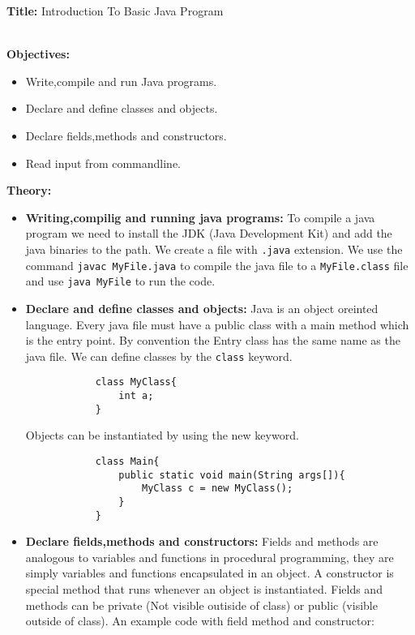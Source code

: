 \documentclass{book}
\begin{document}
{\Huge \textbf{Title:} Introduction To Basic Java Program}
\\
\\
\par
{\large
\textbf{Objectives:}
\begin{itemize}
    \item{Write,compile and run Java programs.}
    \item{Declare and define classes and objects.}
    \item{Declare fields,methods and constructors.}
    \item{Read input from commandline.}
\end{itemize}
\par
\textbf{Theory:}
\begin{itemize}
    \item{\textbf{Writing,compilig and running java programs:}}
        To compile a java program we need to install the JDK (Java Development Kit) and add the java binaries to the path.
        We create a file with \verb|.java| extension. We use the command \verb|javac MyFile.java| to compile the java file to a \verb|MyFile.class| file and use \verb|java MyFile| to run the code.
    \item{\textbf{Declare and define classes and objects:}}
        Java is an object oreinted language. Every java file must have a public class with a main method which is the entry point. By convention the Entry class has the same name as the java file.
        We can define classes by the \verb|class| keyword.
        \begin{verbatim}
            class MyClass{
                int a;
            }
        \end{verbatim}
        Objects can be instantiated by using the new keyword.
        \begin{verbatim}
            class Main{
                public static void main(String args[]){
                    MyClass c = new MyClass();
                }
            }
        \end{verbatim}
    \item{\textbf{Declare fields,methods and constructors:}}
        Fields and methods are analogous to variables and functions in procedural programming, they are simply variables and functions encapsulated in an object.
        A constructor is special method that runs whenever an object is instantiated. Fields and methods can be private (Not visible outiside of class) or public (visible outside of class).
        An example code with field method and constructor:

\end{itemize}}
\end{document}
